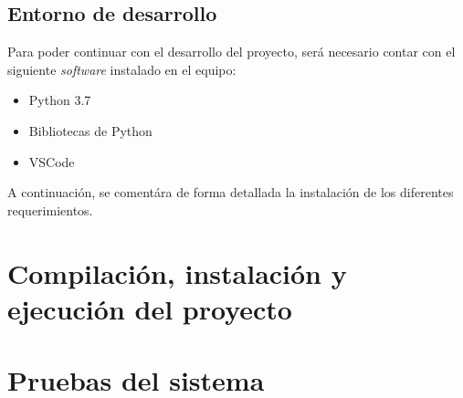 \subsection{Entorno de desarrollo}
Para poder continuar con el desarrollo del proyecto, será necesario contar con el siguiente \textit{software} instalado en el equipo:
\begin{itemize}
    \tightlist
    \item Python 3.7
    \item Bibliotecas de Python
    \item VSCode
\end{itemize}

A continuación, se comentára de forma detallada la instalación de los diferentes requerimientos.

\section{Compilación, instalación y ejecución del proyecto}

\section{Pruebas del sistema}
